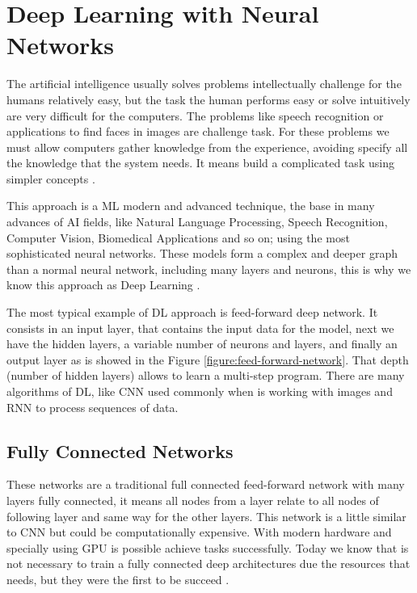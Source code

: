 \documentclass[12pt]{report}
\begin{document}
\section{Deep Learning with Neural Networks}

The artificial intelligence usually solves problems intellectually challenge for the humans relatively easy, but the task the human performs easy or solve intuitively are very difficult for the computers. The problems like speech recognition or applications to find faces in images are challenge task. For these problems we must allow computers gather knowledge from the experience, avoiding specify all the knowledge that the system needs. It means build a complicated task using simpler concepts \cite{Goodfellow2016}.

This approach is a \ac{ML} modern and advanced technique, the base in many advances of  \ac{AI} fields, like Natural Language Processing, Speech Recognition, Computer Vision, Biomedical Applications and so on; using the most sophisticated neural networks. These models form a complex and deeper graph than a normal neural network, including many layers and neurons, this is why we know this approach as Deep Learning \cite{Chandra2017} \cite{Goodfellow2016} \cite{Nevala2017}.

The most typical example of \ac{DL} approach is feed-forward deep network. It consists in an input layer, that contains the input data for the model, next we have the hidden layers, a variable number of neurons and layers, and finally an output layer as is showed in the Figure \ref{figure:feed-forward-network}. That depth (number of hidden layers) allows to learn a multi-step program. There are many algorithms of \ac{DL}, like \ac{CNN} used commonly when is working with images and \ac{RNN} to process sequences of data. 

\subsection{Fully Connected Networks}
These networks are a traditional full connected feed-forward network with many layers fully connected, it means all nodes from a layer relate to all nodes of following layer and same way for the other layers. This network is a little similar to \ac{CNN} but could be computationally expensive. With modern hardware and specially using \ac{GPU} is possible achieve tasks successfully. Today we know that is not necessary to train a fully connected deep architectures due the resources that needs, but they were the first to be succeed \cite{Goodfellow2016}.
\end{document}
